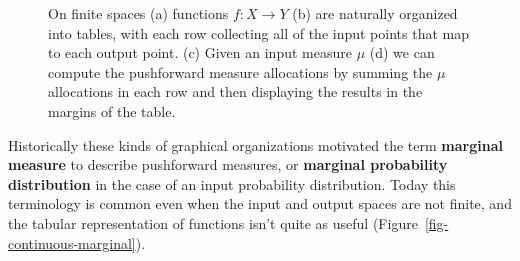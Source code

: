 \documentclass[
  letterpaper,
  DIV=11,
  numbers=noendperiod]{scrartcl}
\begin{document}
\begin{figure}
\begin{minipage}[t]{\linewidth}
{{}

}

\subcaption{\label{fig-finite-marginal-initial-allocations}}
\end{minipage}%
\newline
\begin{minipage}[t]{\linewidth}

{\centering 


}

\subcaption{\label{fig-finite-marginal-marginal-allocations}}
\end{minipage}%

\caption{\label{fig-finite-marginal}On finite spaces (a) functions
\(f: X \rightarrow Y\) (b) are naturally organized into tables, with
each row collecting all of the input points that map to each output
point. (c) Given an input measure \(\mu\) (d) we can compute the
pushforward measure allocations by summing the \(\mu\) allocations in
each row and then displaying the results in the margins of the table.}

\end{figure}

Historically these kinds of graphical organizations motivated the term
\textbf{marginal measure} to describe pushforward measures, or
\textbf{marginal probability distribution} in the case of an input
probability distribution. Today this terminology is common even when the
input and output spaces are not finite, and the tabular representation
of functions isn't quite as useful
(Figure~\ref{fig-continuous-marginal}).
\end{document}
